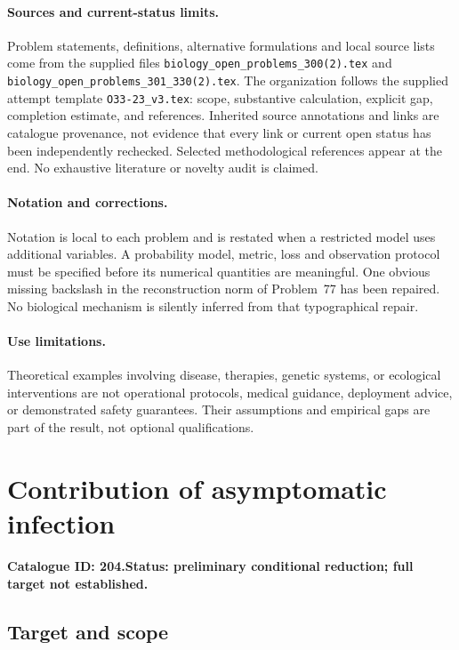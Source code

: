 \documentclass[11pt]{article}
\begin{document}
\paragraph{Sources and current-status limits.}
Problem statements, definitions, alternative formulations and local source lists
come from the supplied files
\texttt{biology\_open\_problems\_300(2).tex} and
\texttt{biology\_open\_problems\_301\_330(2).tex}.
The organization follows the supplied attempt template
\texttt{O33-23\_v3.tex}: scope, substantive calculation, explicit gap,
completion estimate, and references. Inherited source annotations and links are
catalogue provenance, not evidence that every link or current open status has
been independently rechecked. Selected methodological references appear at the
end. No exhaustive literature or novelty audit is claimed.

\paragraph{Notation and corrections.}
Notation is local to each problem and is restated when a restricted model uses
additional variables. A probability model, metric, loss and observation protocol
must be specified before its numerical quantities are meaningful. One obvious
missing backslash in the reconstruction norm of Problem~77 has been repaired.
No biological mechanism is silently inferred from that typographical repair.

\paragraph{Use limitations.}
Theoretical examples involving disease, therapies, genetic systems, or ecological
interventions are not operational protocols, medical guidance, deployment advice,
or demonstrated safety guarantees. Their assumptions and empirical gaps are part
of the result, not optional qualifications.

\setcounter{section}{203}
\section{Contribution of asymptomatic infection}
\label{prob:204}
\noindent\textbf{Catalogue ID: 204.}\quad \textbf{Status: preliminary conditional reduction; full target not established.}
\subsection{Target and scope}
\end{document}
